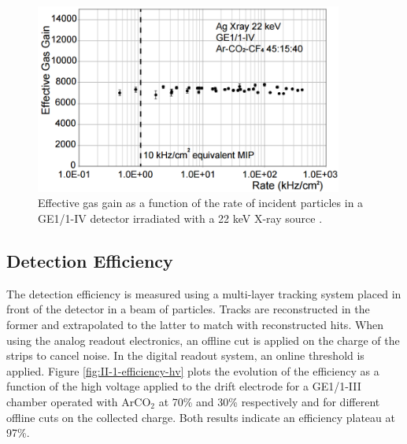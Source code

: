       \begin{figure}[h!]
        \centering
        \includegraphics[width=0.9\textwidth]{img/II-1-gem/rate.png}
        \caption{Effective gas gain as a function of the rate of incident particles in a GE1/1-IV detector irradiated with a 22 keV X-ray source \cite{Colaleo:2021453}.}
        \label{fig:II-1-rate-mes}
      \end{figure}

    \subsection{Detection Efficiency}

      The detection efficiency is measured using a multi-layer tracking system placed in front of the detector in a beam of particles. Tracks are reconstructed in the former and extrapolated to the latter to match with reconstructed hits. When using the analog readout electronics, an offline cut is applied on the charge of the strips to cancel noise. In the digital readout system, an online threshold is applied. Figure \ref{fig:II-1-efficiency-hv} plots the evolution of the efficiency as a function of the high voltage applied to the drift electrode for a GE1/1-III chamber operated with ArCO$_2$ at 70\% and 30\% respectively and for different offline cuts on the collected charge. Both results indicate an efficiency plateau at 97\%. \\

